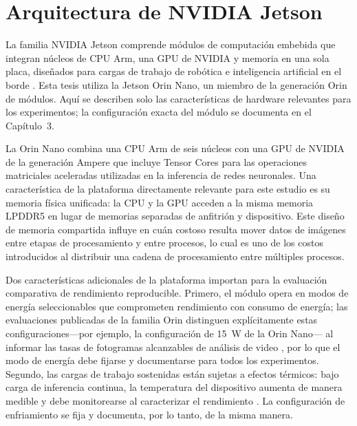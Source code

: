 \section{Arquitectura de NVIDIA Jetson}
\label{sec:jetson}

La familia NVIDIA Jetson comprende módulos de computación embebida que
integran núcleos de CPU Arm, una GPU de NVIDIA y memoria en una sola placa,
diseñados para cargas de trabajo de robótica e inteligencia artificial en
el borde \cite{scalcon2024}. Esta tesis utiliza la Jetson Orin Nano, un
miembro de la generación Orin de módulos. Aquí se describen solo las
características de hardware relevantes para los experimentos; la
configuración exacta del módulo se documenta en el Capítulo~3.

La Orin Nano combina una CPU Arm de seis núcleos con una GPU de NVIDIA de la
generación Ampere que incluye Tensor Cores para las operaciones matriciales
aceleradas utilizadas en la inferencia de redes neuronales.
Una característica de la plataforma directamente relevante para este estudio
es su memoria física unificada: la CPU y la GPU acceden a la misma memoria
LPDDR5 en lugar de memorias separadas de anfitrión y dispositivo.
Este diseño de memoria compartida influye en cuán costoso resulta mover
datos de imágenes entre etapas de procesamiento y entre procesos, lo cual es
uno de los costos introducidos al distribuir una cadena de procesamiento
entre múltiples procesos.

Dos características adicionales de la plataforma importan para la evaluación
comparativa de rendimiento reproducible. Primero, el módulo opera en modos
de energía seleccionables que comprometen rendimiento con consumo de
energía; las evaluaciones publicadas de la familia Orin distinguen
explícitamente estas configuraciones---por ejemplo, la configuración de
15~W de la Orin Nano--- al informar las tasas de fotogramas alcanzables de
análisis de video \cite{scalcon2024}, por lo que el modo de energía debe
fijarse y documentarse para todos los experimentos. Segundo, las cargas de
trabajo sostenidas están sujetas a efectos térmicos: bajo carga de
inferencia continua, la temperatura del dispositivo aumenta de manera
medible y debe monitorearse al caracterizar el rendimiento \cite{zequn2026}.
La configuración de enfriamiento se fija y documenta, por lo tanto, de la
misma manera.

